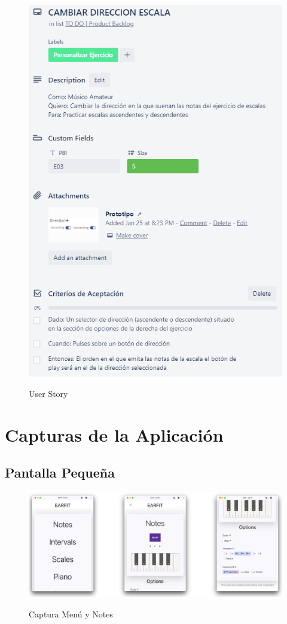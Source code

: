 \documentclass[12pt,twoside,titlepage]{report}
\begin{document}
{\begin{figure}[H]
    \centering
    \includegraphics[scale=1.3]{Scrum/User Stories/EscalasDireccion}
    \label{fig:EscalasDireccion}
    \caption{User Story}
\end{figure}

\chapter{Capturas de la Aplicación}

\section{Pantalla Pequeña}

\begin{figure}[H]
    \centering
    \includegraphics[scale=0.7]{Capturas Earfit/Movil/Movil1}
    \label{fig:Movil1}
    \caption{Captura Menú y Notes}
\end{figure}

}
\end{document}
